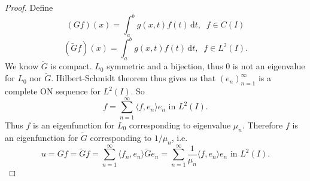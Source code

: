 \documentclass[12pt, a4paper]{article}
\newcommand{\rd}{\ensuremath{\mathrm{d}}}
\newcommand{\id}{\ensuremath{\,\rd}}
\begin{document}
\begin{proof}
Define
\begin{equation*}
(Gf)(x) = \int_a^b g(x,t)f(t)\id t,\;\; f\in C(I)
\end{equation*}
\begin{equation*}
(\tilde{G}f)(x) = \int_a^b g(x,t) f(t)\id t, \;\; f\in L^2(I).
\end{equation*}
We know $\tilde{G}$ is compact. $L_0$ symmetric and a bijection, thus $0$ is not an eigenvalue for $L_0$ nor $\tilde{G}$. Hilbert-Schmidt theorem thus gives us that $(e_n)_{n=1}^\infty$ is a complete ON sequence for $L^2(I)$. So
\begin{equation*}
f = \sum_{n=1}^\infty \langle f, e_n \rangle e_n \text{ in } L^2(I).
\end{equation*}
Thus $f$ is an eigenfunction for $L_0$ corresponding to eigenvalue $\mu_n$. Therefore $f$ is an eigenfunction for $\tilde{G}$ corresponding to $1/\mu_n$, i.e.
\begin{equation*}
u = Gf = \tilde{G}f = \sum_{n=1}^\infty \langle f_n, e_n\rangle \tilde{G}e_n = \sum_{n=1}^\infty \dfrac{1}{\mu_n}\langle f, e_n\rangle e_n \text{ in } L^2(I).
\end{equation*}
\end{proof}
\end{document}
